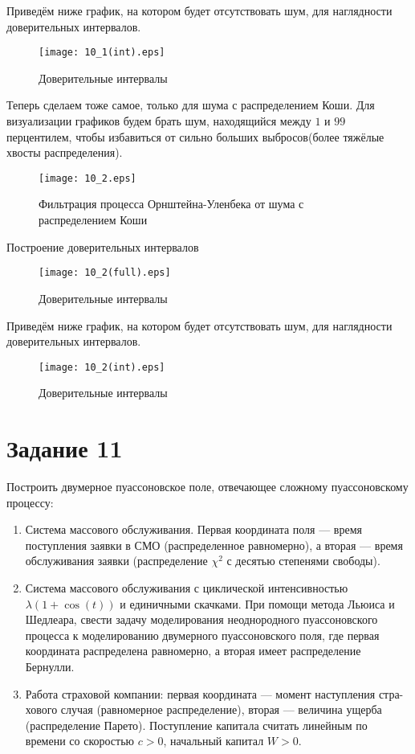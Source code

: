 \documentclass[11pt]{article}
\begin{document}
Приведём ниже график, на котором будет отсутствовать шум, для наглядности доверительных интервалов.
\begin{figure}[ht]
    \texttt{[image: 10\_1(int).eps]} 
    \caption{Доверительные интервалы}
\end{figure} 
\FloatBarrier


Теперь сделаем тоже самое, только для шума с распределением Коши. Для визуализации графиков будем брать шум, находящийся между $1$ и $99$ перцентилем, чтобы избавиться от сильно больших выбросов(более тяжёлые хвосты распределения). 

\begin{figure}[ht]
    \texttt{[image: 10\_2.eps]} 
    \caption{Фильтрация процесса Орнштейна-Уленбека от шума с распределением Коши}
\end{figure} 
Построение доверительных интервалов
\begin{figure}[ht]
    \texttt{[image: 10\_2(full).eps]} 
    \caption{Доверительные интервалы}
\end{figure} 

Приведём ниже график, на котором будет отсутствовать шум, для наглядности доверительных интервалов.
\begin{figure}[ht]
    \texttt{[image: 10\_2(int).eps]} 
    \caption{Доверительные интервалы}
\end{figure} 
\FloatBarrier




\section{Задание 11}
Построить двумерное пуассоновское поле, отвечающее сложному пуассоновскому процессу:
\begin{enumerate}
 \item Система массового обслуживания. Первая координата поля — время поступления заявки в СМО (распределенное равномерно), а вторая — время обслуживания заявки (распределение $\chi^2$ с десятью степенями свободы). 
  \item Система массового обслуживания с циклической интенсивностью $\lambda(1+\cos(t))$ и
единичными скачками. При помощи метода Льюиса и Шедлеара, свести задачу
моделирования неоднородного пуассоновского процесса к моделированию двумерного пуассоновского поля, где первая координата распределена равномерно,
а вторая имеет распределение Бернулли. 
  \item Работа страховой компании: первая координата — момент наступления стра-
хового случая (равномерное распределение), вторая — величина ущерба (распределение Парето). Поступление капитала считать линейным по времени со скоростью $c > 0$, начальный капитал $W > 0$.
\end{enumerate}
\end{document}
